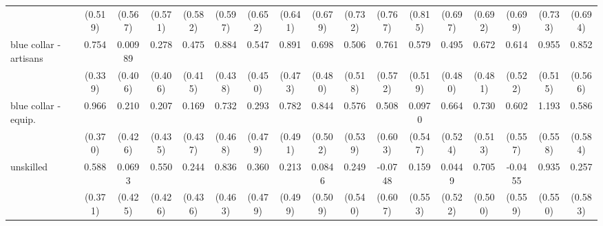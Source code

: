 {\begin{tabular}{l*{16}{c}}
                    &     (0.519)         &     (0.567)         &     (0.571)         &     (0.582)         &     (0.597)         &     (0.652)         &     (0.641)         &     (0.679)         &     (0.732)         &     (0.767)         &     (0.815)         &     (0.697)         &     (0.692)         &     (0.699)         &     (0.733)         &     (0.694)         \\
[1em]
blue collar - artisans&       0.754\sym{*}  &     0.00989         &       0.278         &       0.475         &       0.884\sym{*}  &       0.547         &       0.891         &       0.698         &       0.506         &       0.761         &       0.579         &       0.495         &       0.672         &       0.614         &       0.955         &       0.852         \\
                    &     (0.339)         &     (0.406)         &     (0.406)         &     (0.415)         &     (0.438)         &     (0.450)         &     (0.473)         &     (0.480)         &     (0.518)         &     (0.572)         &     (0.519)         &     (0.480)         &     (0.481)         &     (0.522)         &     (0.515)         &     (0.566)         \\
[1em]
blue collar - equip.&       0.966\sym{**} &       0.210         &       0.207         &       0.169         &       0.732         &       0.293         &       0.782         &       0.844         &       0.576         &       0.508         &      0.0970         &       0.664         &       0.730         &       0.602         &       1.193\sym{*}  &       0.586         \\
                    &     (0.370)         &     (0.426)         &     (0.435)         &     (0.437)         &     (0.468)         &     (0.479)         &     (0.491)         &     (0.502)         &     (0.539)         &     (0.603)         &     (0.547)         &     (0.524)         &     (0.513)         &     (0.557)         &     (0.558)         &     (0.584)         \\
[1em]
unskilled           &       0.588         &      0.0693         &       0.550         &       0.244         &       0.836         &       0.360         &       0.213         &      0.0846         &       0.249         &     -0.0748         &       0.159         &      0.0449         &       0.705         &     -0.0455         &       0.935         &       0.257         \\
                    &     (0.371)         &     (0.425)         &     (0.426)         &     (0.436)         &     (0.463)         &     (0.479)         &     (0.499)         &     (0.509)         &     (0.540)         &     (0.607)         &     (0.553)         &     (0.522)         &     (0.500)         &     (0.559)         &     (0.550)         &     (0.583)         \\

\end{tabular}}
